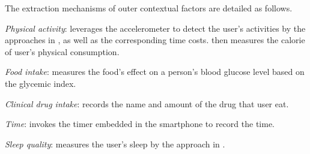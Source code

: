 

The extraction mechanisms of outer contextual factors are detailed as follows.

\emph{Physical activity}:
\sysname leverages the accelerometer to detect the user's activities by the approaches in \cite{bayat2014study}, as well as the corresponding time costs.
\sysname then measures the calorie of user's physical consumption.

\emph{Food intake}:
\sysname measures the food's effect on a person's blood glucose level based on the glycemic index.

\emph{Clinical drug intake}:
\sysname records the name and amount of the drug that user eat.

\emph{Time}:
\sysname invokes the timer embedded in the smartphone to record the time.

\emph{Sleep quality}:
\sysname measures the user's sleep by the approach in \cite{gu2014intelligent}.
